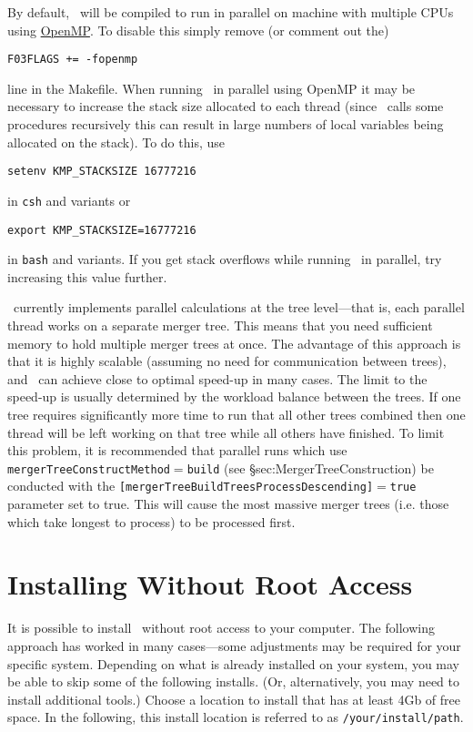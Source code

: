 By default, \glc\ will be compiled to run in parallel on machine with multiple CPUs using \href{http://openmp.org/wp/}{OpenMP}. To disable this simply remove (or comment out the)
\begin{verbatim}
F03FLAGS += -fopenmp
\end{verbatim}
line in the Makefile. When running \glc\ in parallel using OpenMP it may be necessary to increase the stack size allocated to each thread (since \glc\ calls some procedures recursively this can result in large numbers of local variables being allocated on the stack). To do this, use
\begin{verbatim}
setenv KMP_STACKSIZE 16777216
\end{verbatim}
in {\tt csh} and variants or
\begin{verbatim}
export KMP_STACKSIZE=16777216
\end{verbatim}
in {\tt bash} and variants. If you get stack overflows while running \glc\ in parallel, try increasing this value further.

\glc\ currently implements parallel calculations at the tree level---that is, each parallel thread works on a separate merger tree. This means that you need sufficient memory to hold multiple merger trees at once. The advantage of this approach is that it is highly scalable (assuming no need for communication between trees), and \glc\ can achieve close to optimal speed-up in many cases. The limit to the speed-up is usually determined by the workload balance between the trees. If one tree requires significantly more time to run that all other trees combined then one thread will be left working on that tree while all others have finished. To limit this problem, it is recommended that parallel runs which use {\tt mergerTreeConstructMethod}$=${\tt build} (see \S{sec:MergerTreeConstruction}) be conducted with the {\tt [mergerTreeBuildTreesProcessDescending]}$=${\tt true} parameter set to true. This will cause the most massive merger trees (i.e. those which take longest to process) to be processed first.

\section{Installing Without Root Access}

It is possible to install \glc\ without root access to your computer. The following approach has worked in many cases---some adjustments may be required for your specific system. Depending on what is already installed on your system, you may be able to skip some of the following installs. (Or, alternatively, you may need to install additional tools.) Choose a location to install that has at least 4Gb of free space. In the following, this install location is referred to as {\tt /your/install/path}.

